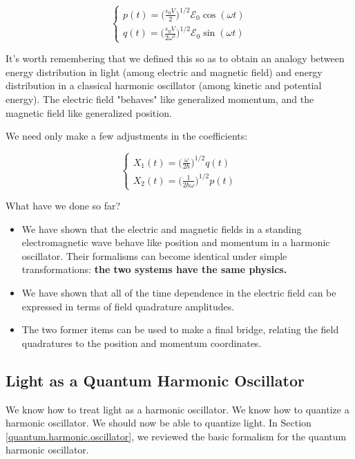\documentclass[12pt,a4paper]{report}
\begin{document}
\begin{equation}
    \begin{cases}
        p(t)=\Big(\frac{\epsilon_0V}{2}\Big)^{1/2}\mathcal{E}_0\cos(\omega t)\\[0.3cm]
        q(t)=\Big(\frac{\epsilon_0V}{2\omega^2}\Big)^{1/2}\mathcal{E}_0\sin(\omega t)
    \end{cases}
\end{equation}

It's worth remembering that we defined this so as to obtain an analogy between energy distribution in light (among electric and magnetic field) and energy distribution in a classical harmonic oscillator (among kinetic and potential energy). The electric field "behaves" like generalized momentum, and the magnetic field like generalized position.

We need only make a few adjustments in the coefficients:

\begin{equation}
    \boxed{\begin{cases}
        X_1(t)= \big(\frac{\omega}{2\hbar}\big)^{1/2}q(t)\\[0.3cm]
        X_2(t)=\big(\frac{1}{2\hbar\omega}\big)^{1/2}p(t)
    \end{cases}}
\end{equation}

What have we done so far?

\begin{itemize}
    \item We have shown that the electric and magnetic fields in a standing electromagnetic wave behave like position and momentum in a harmonic oscillator. Their formalisms can become identical under simple transformations: \textbf{the two systems have the same physics.}
    \item We have shown that all of the time dependence in the electric field can be expressed in terms of field quadrature amplitudes.
    \item The two former items can be used to make a final bridge, relating the field quadratures to the position and momentum coordinates.
\end{itemize}

\subsection{Light as a Quantum Harmonic Oscillator}

We know how to treat light as a harmonic oscillator. We know how to quantize a harmonic oscillator. We should now be able to quantize light. In Section \ref{quantum.harmonic.oscillator}, we reviewed the basic formalism for the quantum harmonic oscillator.
\end{document}
